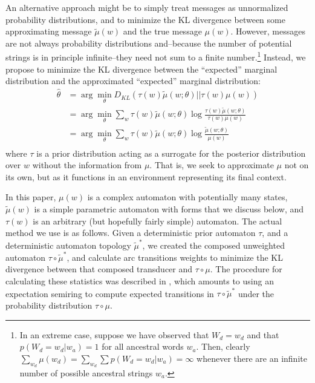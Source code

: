 \documentclass[11pt,a4paper]{article}
\begin{document}
An alternative approach might be to simply treat messages as
unnormalized probability distributions, and to minimize the KL
divergence between some approximating message $\tilde\mu(w)$ and
the true message $\mu(w)$.  However, messages are not always
probability distributions and--because the number of potential
strings is in principle infinite--they need not sum to a finite
number.\footnote{In an extreme case, suppose we have observed that
$W_d=w_d$ and that $p(W_d=w_d|w_a)=1$ for all ancestral words $w_a$.
Then, clearly $\sum_{w_d} \mu(w_d) = \sum_{w_d} \sum p(W_d=w_d|w_a)
= \infty$ whenever there are an infinite number of possible ancestral
strings $w_a$.} Instead, we propose to minimize the KL divergence
between the ``expected'' marginal distribution and the approximated
``expected'' marginal distribution:
\begin{equation}
  \begin{split}
    \hat\theta &= \arg\!\min_{\theta} D_{KL}(\tau(w)\tilde\mu(w;\theta)||\tau(w)\mu(w) ) \\
    &= \arg\!\min_{\theta} \sum_w \tau(w) \tilde\mu(w;\theta) \log \frac{\tau(w)\tilde\mu(w;\theta)}{\tau(w)\mu(w)} \\
    &= \arg\!\min_{\theta} \sum_w \tau(w) \tilde\mu(w;\theta) \log \frac{\tilde\mu(w;\theta)}{\mu(w)} \\
   \end{split}
 \end{equation}
where $\tau$ is a prior distribution acting as a surrogate for the
posterior distribution over $w$ without the information from $\mu$.
That is, we seek to approximate $\mu$ not on its own, but as it
functions in an environment representing its final context.

In this paper, $\mu(w)$ is a complex automaton with potentially
many states, $\tilde\mu(w)$ is a simple parametric automaton with
forms that we discuss below, and $\tau(w)$ is an arbitrary (but
hopefully fairly simple) automaton. The actual method we use is as
follows. Given a deterministic prior automaton $\tau$, and a
deterministic automaton topology $\tilde\mu^*$, we created the
composed unweighted automaton $\tau \circ \tilde\mu^*$, and calculate
arc transitions weights to minimize the KL divergence between that
composed transducer and $\tau\circ\mu$. The procedure for calculating
these statistics was described in , which
amounts to using an expectation semiring \cite{eisner2001expectation}
to compute expected transitions in $\tau\circ\tilde\mu^*$ under the
probability distribution $\tau\circ\mu$.
\end{document}
